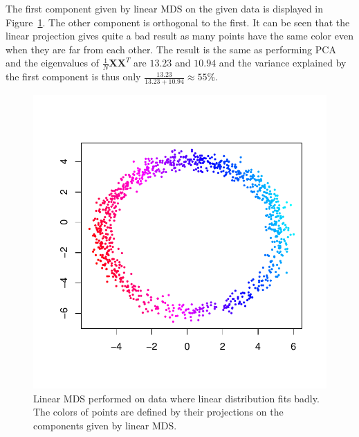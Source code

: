 \documentclass{article}
\renewcommand\vec[1]{\ensuremath{\mathbf{#1}}}
\begin{document}
The first component given by linear MDS on the given data is displayed in Figure~\ref{fig:mds}.
The other component is orthogonal to the first.
It can be seen that the linear projection gives quite a bad result as many points have the same color even when they are far from each other.
The result is the same as performing PCA and the eigenvalues of $\frac{1}{N}\vec X\vec X^T$ are $13.23$ and $10.94$ and the variance explained by the first component is thus only $\frac{13.23}{13.23+10.94}\approx 55\%$.
\begin{figure}\begin{minipage}{0.4\columnwidth}\centering
	\includegraphics[scale=0.6]{mds}
	\caption{Linear MDS performed on data where linear distribution fits badly. The colors of points are defined by their projections on the components given by linear MDS.}\label{fig:mds}
\end{minipage}\hfil\begin{minipage}{0.4\columnwidth}\centering

\end{minipage}
\end{figure}
\end{document}
